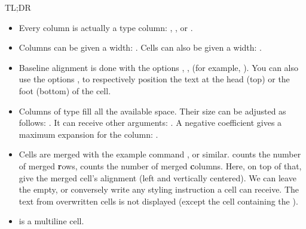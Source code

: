\begin{infobox}{TL;DR}
	\begin{itemize}
		\item Every column is actually a  type column: , ,  or .
		\item Columns can be given a width: . Cells can also be given a width: .
		\item Baseline alignment is done with the options , ,  (for example, ). You can also use the options ,  to respectively position the text at the head (top) or the foot (bottom) of the cell.
		\item Columns of type  fill all the available space. Their size can be adjusted as follows: . It can receive other arguments: . A negative coefficient gives a maximum expansion for the  column: .
		\item Cells are merged with the example command , or similar.  counts the number of merged \textbf{r}ows,  counts the number of merged \textbf{c}olumns. Here, on top of that,  give the merged cell's alignment (left and vertically centered). We can leave the \snippet{\{\}} empty, or conversely write any styling instruction a cell can receive. The text from overwritten cells is not displayed (except the cell containing the ).
		\item {} is a multiline cell.
	\end{itemize}


\end{infobox}

